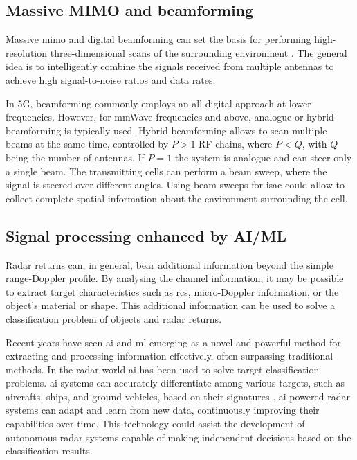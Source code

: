 	 
	
	\subsection{Massive MIMO and beamforming}
	
	Massive \gls{mimo} and digital beamforming can set the basis for performing high-resolution three-dimensional scans of the surrounding environment \cite{MIMO-next-gen}.
	The general idea is to intelligently combine the signals received from multiple antennas to achieve high signal-to-noise ratios and data rates.
	
	In \gls{5G}, beamforming commonly employs an all-digital approach at lower frequencies. However, for mmWave frequencies and above, analogue or hybrid beamforming is typically used. 
	Hybrid beamforming allows to scan multiple beams at the same time, controlled by $P >1$ RF chains, where $P < Q$, with $Q$ being the number of antennas. 
	If $P = 1$ the system is analogue and can steer only a single beam.
	The transmitting cells can perform a beam sweep, where the signal is steered over different angles. 
	Using beam sweeps for \gls{isac} could allow to collect complete spatial information about the environment surrounding the cell.
	
	\subsection{Signal processing enhanced by AI/ML}
	Radar returns can, in general, bear additional information beyond the simple range-Doppler profile. 
	By analysing the channel information, it may be possible to extract target characteristics such as \gls{rcs}, micro-Doppler information, or the object's material or shape.
	This additional information can be used to solve a classification problem of objects and radar returns.
	
	Recent years have seen \gls{ai} and \gls{ml} emerging as a novel and powerful method for extracting and processing information effectively, often surpassing traditional methods.
	In the radar world \gls{ai} has been used to solve target classification problems. 
	\Gls{ai} systems can accurately differentiate among various targets, such as aircrafts, ships, and ground vehicles, based on their signatures \cite{survey_radar_AIML}. 
	\gls{ai}-powered radar systems can adapt and learn from new data, continuously improving their capabilities over time. 
	This technology could assist the development of autonomous radar systems capable of making independent decisions based on the classification results. 
	
